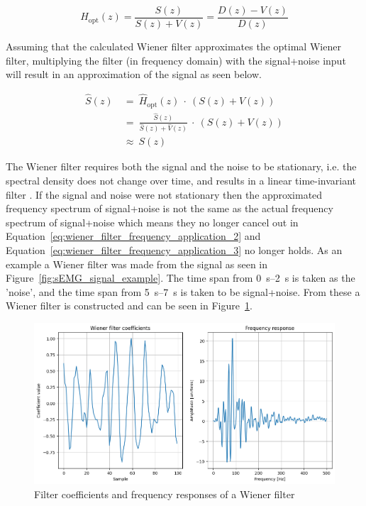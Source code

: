 \begin{equation}
    H_\text{opt}(z) = \frac{S(z)}{S(z) + V(z)} = \frac{D(z) - V(z)}{D(z)} 
    \label{eq:wiener_filter_frequency_behaviour}
\end{equation}

Assuming that the calculated Wiener filter approximates the optimal Wiener filter, multiplying the filter (in frequency domain) with the signal+noise input will result in an approximation of the signal as seen below.

\begin{align}
    \hat{S}(z) & \ = \ \hat{H}_\text{opt}(z) \ \cdot \ \left(S(z) + V(z)\right) \label{eq:wiener_filter_frequency_application_1} \\
    & \ = \ \frac{\hat{S}(z)}{\hat{S}(z) + \hat{V}(z)} \ \cdot \ \left(S(z) + V(z)\right) \label{eq:wiener_filter_frequency_application_2}\\
    & \ \approx \ S(z) \label{eq:wiener_filter_frequency_application_3}
\end{align}

The Wiener filter requires both the signal and the noise to be stationary, i.e. the spectral density does not change over time, and results in a linear time-invariant filter \cite{stationary_processes_definition} \cite{difference_stationary_nonstationary}. If the signal and noise were not stationary then the approximated frequency spectrum of signal+noise is not the same as the actual frequency spectrum of signal+noise which means they no longer cancel out in Equation~\ref{eq:wiener_filter_frequency_application_2} and Equation~\ref{eq:wiener_filter_frequency_application_3} no longer holds.
As an example a Wiener filter was made from the signal as seen in Figure~\ref{fig:sEMG_signal_example}. The time span from \SIrange{0}{2}{\second} is taken as the 'noise', and the time span from \SIrange{5}{7}{\second} is taken to be signal+noise. From these a Wiener filter is constructed and can be seen in Figure~\ref{fig:wiener_filter_response}.

\begin{figure}[h!t]
	\begin{center}
		\includegraphics[width=1.0\columnwidth]{images/wiener_filter_response.png}
	\end{center}
	\caption{Filter coefficients and frequency responses of a Wiener filter}
	\label{fig:wiener_filter_response}
\end{figure}


